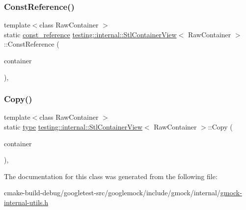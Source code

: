 \subsubsection{\texorpdfstring{ConstReference()}{ConstReference()}}
{\footnotesize\ttfamily template$<$class Raw\+Container $>$ \\
static \mbox{\hyperlink{classtesting_1_1internal_1_1StlContainerView_a9cd4f6ed689b3938cdb7b3c4cbf1b36b}{const\+\_\+reference}} \mbox{\hyperlink{classtesting_1_1internal_1_1StlContainerView}{testing\+::internal\+::\+Stl\+Container\+View}}$<$ Raw\+Container $>$\+::Const\+Reference (\begin{DoxyParamCaption}\item[{const Raw\+Container \&}]{container }\end{DoxyParamCaption})\hspace{0.3cm}{\ttfamily [inline]}, {\ttfamily [static]}}

\mbox{\label{classtesting_1_1internal_1_1StlContainerView_a441123838221f1284873f66ed968f279}} 
\subsubsection{\texorpdfstring{Copy()}{Copy()}}
{\footnotesize\ttfamily template$<$class Raw\+Container $>$ \\
static \mbox{\hyperlink{classtesting_1_1internal_1_1StlContainerView_a2b2c63a6dcdbfe63fb0ee121ebf463ba}{type}} \mbox{\hyperlink{classtesting_1_1internal_1_1StlContainerView}{testing\+::internal\+::\+Stl\+Container\+View}}$<$ Raw\+Container $>$\+::Copy (\begin{DoxyParamCaption}\item[{const Raw\+Container \&}]{container }\end{DoxyParamCaption})\hspace{0.3cm}{\ttfamily [inline]}, {\ttfamily [static]}}



The documentation for this class was generated from the following file\+:\begin{DoxyCompactItemize}
\item 
cmake-\/build-\/debug/googletest-\/src/googlemock/include/gmock/internal/\mbox{\hyperlink{gmock-internal-utils_8h}{gmock-\/internal-\/utils.\+h}}\end{DoxyCompactItemize}
